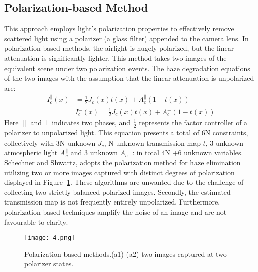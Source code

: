\documentclass[doctor,english,listoffigures,listoftables]{thesis-uestc}
\begin{document}
\subsection{Polarization-based Method}
This approach employs light's polarization properties to effectively remove scattered light using a polarizer (a glass filter) appended to the camera lens. In polarization-based methods, the airlight is hugely polarized, but the linear attenuation is significantly lighter. This method takes two images of the equivalent scene under two polarization events. The haze degradation equations of the two images with the assumption that the linear attenuation is unpolarized are: 
\begin{equation} \label{eq1}
	\begin{split}
		I_c^\parallel  (x) & = \frac{1}{2} J_c(x)t(x)+A_c^\parallel (1-t(x))\\
		& 	I_c^\bot (x) = \frac{1}{2} J_c(x)t(x)+A_c^\bot (1-t(x))
	\end{split}
\end{equation}
Here $\parallel $ and $\bot$ indicates two phases, and $\frac{1}{2}$ represents the factor controller of a polarizer to unpolarized light. This equation presents a total of 6N constraints, collectively with 3N unknown $J_c$, N unknown transmission map $t$, 3 unknown atmospheric light $A_c^\parallel$ and 3 unknown $A_c^\bot$ : in total 4N +6 unknown variables. Schechner and Shwartz, adopts the polarization method for haze elimination utilizing two or more images captured with distinct degrees of polarization displayed in Figure~\ref{fig4}. These algorithms are unwanted due to the challenge of collecting two strictly balanced polarized images. Secondly, the estimated transmission map is not frequently entirely unpolarized. Furthermore, polarization-based techniques amplify the noise of an image and are not favourable to clarity. 



\begin{figure}[H]
	\centering
	\texttt{[image: 4.png]}
	\caption{ Polarization-based methods.(a1)-(a2) two images captured at two polarizer states.}
	\label{fig4}
\end{figure}
\end{document}
